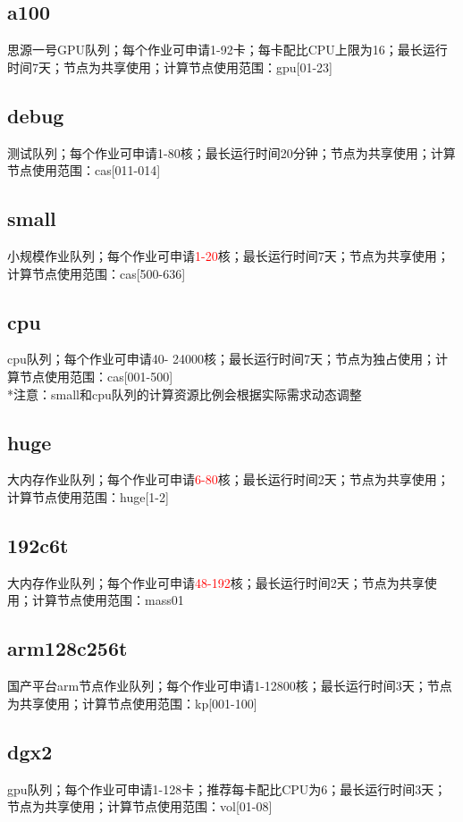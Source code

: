 \documentclass[cn, 12pt, hang, black, chinese]{elegantbook}
\begin{document}
\subsection*{a100}
思源一号GPU队列；每个作业可申请1-92卡；每卡配比CPU上限为16；最长运行时间7天；节点为共享使用；计算节点使用范围：gpu[01-23]

\subsection*{debug}
测试队列；每个作业可申请1-80核；最长运行时间20分钟；节点为共享使用；计算节点使用范围：cas[011-014]

\subsection*{small}
小规模作业队列；每个作业可申请\textcolor{red}{1-20}核；最长运行时间7天；节点为共享使用；计算节点使用范围：cas[500-636]

\subsection*{cpu}
cpu队列；每个作业可申请40- 24000核；最长运行时间7天；节点为独占使用；计算节点使用范围：cas[001-500]\\*注意：small和cpu队列的计算资源比例会根据实际需求动态调整

\subsection*{huge}
大内存作业队列；每个作业可申请\textcolor{red}{6-80}核；最长运行时间2天；节点为共享使用；计算节点使用范围：huge[1-2]

\subsection*{192c6t}
大内存作业队列；每个作业可申请\textcolor{red}{48-192}核；最长运行时间2天；节点为共享使用；计算节点使用范围：mass01

\subsection*{arm128c256t}
国产平台arm节点作业队列；每个作业可申请1-12800核；最长运行时间3天；节点为共享使用；计算节点使用范围：kp[001-100]

\subsection*{dgx2}
gpu队列；每个作业可申请1-128卡；推荐每卡配比CPU为6；最长运行时间3天；节点为共享使用；计算节点使用范围：vol[01-08]
\end{document}
